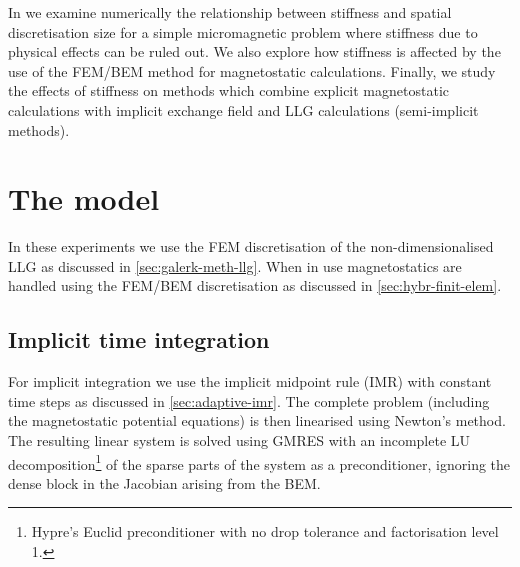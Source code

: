 In  we examine numerically the relationship between stiffness and spatial discretisation size for a simple micromagnetic problem where stiffness due to physical effects can be ruled out.
We also explore how stiffness is affected by the use of the FEM/BEM method for magnetostatic calculations.
Finally, we study the effects of stiffness on methods which combine explicit magnetostatic calculations with implicit exchange field and LLG calculations (\ie semi-implicit methods).

\section{The model}

In these experiments we use the FEM discretisation of the non-dimensionalised LLG as discussed in \cref{sec:galerk-meth-llg}.
When in use magnetostatics are handled using the FEM/BEM discretisation as discussed in \cref{sec:hybr-finit-elem}.

\subsection{Implicit time integration}
For implicit integration we use the implicit midpoint rule (IMR) with constant time steps as discussed in \cref{sec:adaptive-imr}.
The complete problem (including the magnetostatic potential equations) is then linearised using Newton's method.
The resulting linear system is solved using GMRES with an incomplete LU decomposition\footnote{Hypre's Euclid preconditioner \cite{hypre} with no drop tolerance and factorisation level 1.} of the sparse parts of the system as a preconditioner, ignoring the dense block in the Jacobian arising from the BEM.

